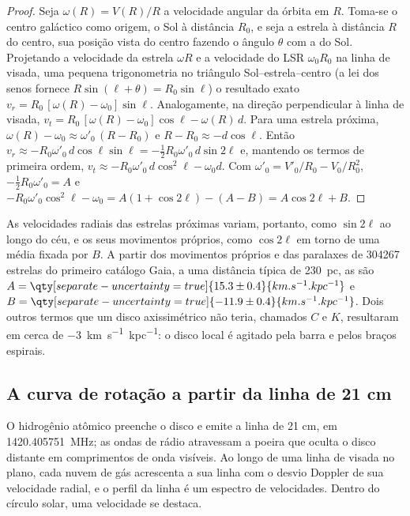 \begin{proof}
Seja $\omega(R) = V(R)/R$ a velocidade angular da órbita em $R$. Toma-se o
centro galáctico como origem, o Sol à distância $R_0$, e seja a estrela à
distância $R$ do centro, sua posição vista do centro fazendo o ângulo
$\theta$ com a do Sol. Projetando a velocidade da estrela
$\omega R$ e a velocidade do LSR $\omega_0 R_0$ na linha de visada, uma
pequena trigonometria no triângulo Sol--estrela--centro (a lei dos senos
fornece $R\sin(\ell + \theta) = R_0\sin\ell$) o resultado exato
$v_r = R_0\,[\omega(R) - \omega_0]\sin\ell$. Analogamente, na direção
perpendicular à linha de visada,
$v_t = R_0\,[\omega(R) - \omega_0]\cos\ell - \omega(R)\,d$. Para uma estrela
próxima, $\omega(R) - \omega_0 \approx \omega'_0\,(R - R_0)$ e
$R - R_0 \approx -d\cos\ell$. Então
$v_r \approx -R_0\omega'_0\,d\cos\ell\sin\ell = -\tfrac12 R_0\omega'_0\,
d\sin 2\ell$ e, mantendo os termos de primeira ordem,
$v_t \approx -R_0\omega'_0\,d\cos^2\ell - \omega_0 d$. Com
$\omega'_0 = V'_0/R_0 - V_0/R_0^2$, $-\tfrac12 R_0\omega'_0 = A$ e
$-R_0\omega'_0\cos^2\ell - \omega_0 = A(1 + \cos 2\ell) - (A - B) =
A\cos 2\ell + B$.
\end{proof}

As velocidades radiais das estrelas próximas variam, portanto, como $\sin 2\ell$ ao
longo do céu, e os seus movimentos próprios, como $\cos 2\ell$ em torno de uma média fixada por $B$.
A partir dos movimentos próprios e das paralaxes de \num{304267} estrelas do primeiro
catálogo Gaia, a uma distância típica de \qty{230}{pc}, as 
são $A = \qty[separate-uncertainty=true]{15.3 \pm 0.4}{km.s^{-1}.kpc^{-1}}$
e $B = \qty[separate-uncertainty=true]{-11.9 \pm 0.4}{km.s^{-1}.kpc^{-1}}$.
Dois outros termos que um disco axissimétrico não teria, chamados $C$
e $K$, resultaram em cerca de \qty{-3}{km.s^{-1}.kpc^{-1}}: o disco local é
agitado pela barra e pelos braços espirais.

\subsection*{A curva de rotação a partir da linha de 21 cm}

O hidrogênio atômico preenche o disco e emite a linha de 21 cm, em
\qty{1420.405751}{MHz}; as ondas de rádio atravessam a poeira que oculta o
disco distante em comprimentos de onda visíveis. Ao longo de uma linha de visada
no plano, cada nuvem de gás acrescenta a sua linha com o desvio Doppler de
sua velocidade radial, e o perfil da linha é um espectro de
velocidades. Dentro do círculo solar, uma velocidade se destaca.


